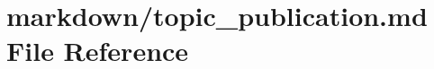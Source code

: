 \hypertarget{topic__publication_8md}{}\section{markdown/topic\+\_\+publication.md File Reference}
\label{topic__publication_8md}
